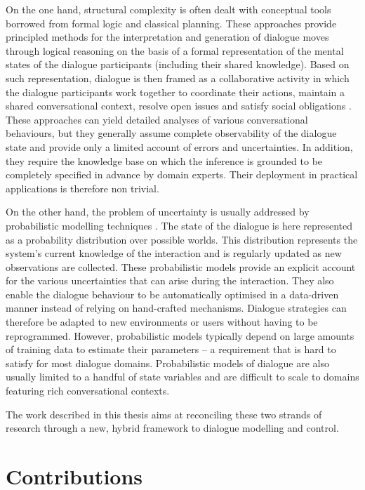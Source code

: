 On the one hand, structural complexity is often dealt with conceptual tools borrowed from formal logic and classical planning.  These approaches provide principled methods for the interpretation and generation of dialogue moves through logical reasoning on the basis of a formal representation of the mental states of the dialogue participants (including their shared knowledge). Based on such representation, dialogue is then framed as a collaborative activity in which the dialogue participants work together to coordinate their actions, maintain a shared conversational context, resolve open issues and satisfy social obligations \citep{larsson2002,Jokinen:2009,Ginzburg2012}. These approaches can yield detailed analyses of various conversational behaviours, but they generally assume complete observability of the dialogue state and provide only a limited account of errors and uncertainties. In addition, they require the knowledge base on which the inference is grounded to be completely specified in advance by domain experts.  Their deployment in practical applications is therefore non trivial. 

On the other hand, the problem of uncertainty is usually addressed by probabilistic modelling techniques \citep{Roy:2000,FramptonL09,Young:2010}.  The state of the dialogue is here represented as a probability distribution over possible worlds.  This distribution represents the system's current knowledge of the interaction and is regularly updated as new observations are collected. These probabilistic models provide an explicit account for the various uncertainties that can arise during the interaction. They also enable the dialogue behaviour to be automatically optimised in a data-driven manner instead of relying on hand-crafted mechanisms.  Dialogue strategies can therefore be adapted to new environments or users without having to be reprogrammed. However, probabilistic models typically depend on large amounts of training data to estimate their parameters -- a requirement that is hard to satisfy for most dialogue domains.  Probabilistic models of dialogue are also usually limited to a handful of state variables and are difficult to scale to domains featuring rich conversational contexts. 

The work described in this thesis aims at reconciling these two strands of research through a new, hybrid framework to dialogue modelling and control. 

\section{Contributions}

